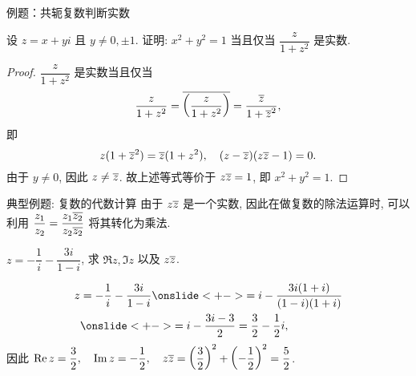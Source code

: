 \begin{frame}{例题：共轭复数判断实数}
\begin{example}
设 $z=x+yi$ 且 $y\neq 0,\pm1$. 证明: $x^2+y^2=1$ 当且仅当 $\dfrac z{1+z^2}$ 是实数.
\end{example}
\begin{proof}
$\dfrac z{1+z^2}$ 是实数当且仅当
\[\frac z{1+z^2}=\overline{\left(\frac z{1+z^2}\right)}=\frac{\overline z}{1+{\overline z}^2},\]
\onslide<+->
即
\vspace{-\baselineskip}
\[z(1+{\overline z}^2)=\overline z(1+z^2),\quad (z-\overline z)(z\overline z-1)=0.\]
\onslide<+->
由于 $y\neq0$, 因此 $z\neq \overline z$.
\onslide<+->
故上述等式等价于 $z\overline z=1$, 即 $x^2+y^2=1$.
\end{proof}
\end{frame}


\begin{frame}{典型例题: 复数的代数计算}
\beqskip{6pt}
\onslide<+->
由于 $z\overline z$ 是一个实数,
\onslide<+->
因此在做复数的除法运算时, 可以利用
$\dfrac{z_1}{z_2}=\dfrac{z_1\overline{z_2}}{z_2\overline{z_2}}$
将其转化为乘法.
\begin{example}
$z=-\dfrac1i-\dfrac{3i}{1-i}$, 求 $\Re z,\Im z$ 以及 $z\overline z$.
\end{example}
\begin{solution}
\vspace{-\baselineskip}
\begin{align*}
z&=-\frac1i-\frac{3i}{1-i}
\onslide<+->{=i-\frac{3i(1+i)}{(1-i)(1+i)}}\\
&\onslide<+->{=i-\frac{3i-3}2=\frac32-\frac12i,}
\end{align*}
\onslide<+->
因此
$\displaystyle\operatorname{Re} z=\frac32,\quad\operatorname{Im} z=-\frac12,\quad
z\overline z=\left(\frac32\right)^2+\left(-\frac12\right)^2=\frac52$.
\end{solution}
\endgroup
\end{frame}


